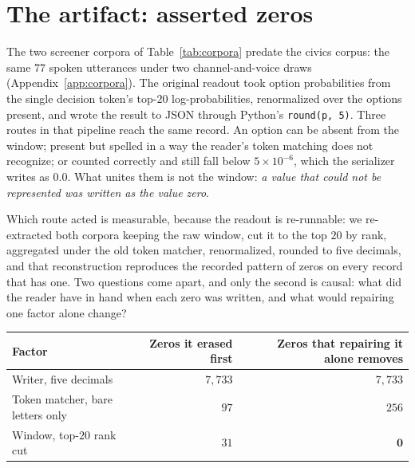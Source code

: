 \documentclass{article}
\begin{document}
\section{The artifact: asserted zeros}\label{sec:artifact}
The two screener corpora of Table~\ref{tab:corpora} predate the civics corpus: the same $77$ spoken utterances under two
channel-and-voice draws (Appendix~\ref{app:corpora}).
The original readout took option probabilities from the single decision token's
top-$20$ log-probabilities, renormalized over the options present, and wrote the
result to JSON through Python's \texttt{round(p, 5)}. Three routes in that pipeline
reach the same record. An option can be absent from the window; present but
spelled in a way the reader's token matching does not recognize; or counted
correctly and still fall below $5\times10^{-6}$, which the serializer writes as
$0.0$. What unites them is not the window: \emph{a value that could not be
represented was written as the value zero}.

Which route acted is measurable, because the readout is re-runnable: we
re-extracted both corpora keeping the raw window, cut it to the top $20$ by
rank, aggregated under the old token matcher, renormalized, rounded to five decimals, and that reconstruction reproduces the recorded pattern of zeros on every record that has one. Two questions come apart, and only the second is causal: what did the reader have in hand when each zero was written, and what would
repairing one factor alone change?

\label{tab:blame}
\begin{center}\small
\begin{tabular}{lrr}
\toprule
Factor & Zeros it erased first & Zeros that repairing it alone removes \\
\midrule
Writer, five decimals & $7{,}733$ & $7{,}733$ \\
Token matcher, bare letters only & $97$ & $256$ \\
Window, top-$20$ rank cut & $31$ & $\mathbf{0}$ \\
\bottomrule
\end{tabular}
\end{center}
\end{document}
